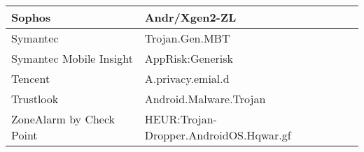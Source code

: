 \begin{tabular}{|l|l|}
    Sophos                   & Andr/Xgen2-ZL                          \\ \hline
    Symantec                 & Trojan.Gen.MBT                         \\ \hline
    Symantec Mobile Insight  & AppRisk:Generisk                       \\ \hline
    Tencent                  & A.privacy.emial.d                      \\ \hline
    Trustlook                & Android.Malware.Trojan                 \\ \hline
    ZoneAlarm by Check Point & HEUR:Trojan-Dropper.AndroidOS.Hqwar.gf \\ \hline
\end{tabular}